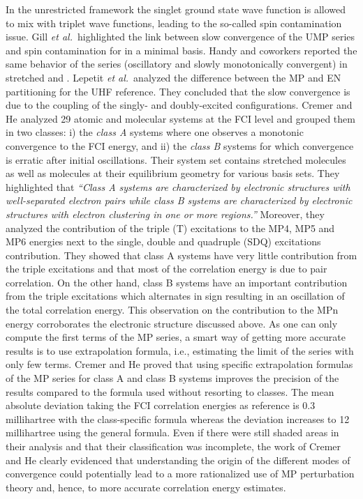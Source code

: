 \documentclass[aps,prb,reprint,noshowkeys,superscriptaddress]{revtex4-1}
\newcommand{\latin}[1]{#1}
\newcommand{\ie}{\latin{i.e.}}
\begin{document}
In the unrestricted framework the singlet ground state wave function is allowed to mix with triplet wave functions, leading to the so-called spin contamination issue. Gill \textit{et al.}~highlighted the link between slow convergence of the UMP series and spin contamination for  in a minimal basis. \cite{Gill_1988}
Handy and coworkers reported the same behavior of the series (oscillatory and slowly monotonically convergent) in stretched  and . \cite{Handy_1985} Lepetit \textit{et al.}~analyzed the difference between the MP and EN partitioning for the UHF reference. \cite{Lepetit_1988} 
They concluded that the slow convergence is due to the coupling of the singly- and doubly-excited configurations. 
Cremer and He analyzed 29 atomic and molecular systems at the FCI level \cite{Cremer_1996} and grouped them in two classes: i) the \textit{class A} systems where one observes a monotonic convergence to the FCI energy, and ii) the \textit{class B} systems for which convergence is erratic after initial oscillations. Their system set contains stretched molecules as well as molecules at their equilibrium geometry for various basis sets. They highlighted that \cite{Cremer_1996}
\textit{``Class A systems are characterized by electronic structures with well-separated electron pairs while class B systems are characterized by electronic structures with electron clustering in one or more regions.''}
Moreover, they analyzed the contribution of the triple (T) excitations to the MP4, MP5 and MP6 energies next to the single, double and quadruple (SDQ) excitations contribution.
They showed that class A systems have very little contribution from the triple excitations and that most of the correlation energy is due to pair correlation. On the other hand, class B systems have an important contribution from the triple excitations which alternates in sign resulting in an oscillation of the total correlation energy.
This observation on the contribution to the MPn energy corroborates the electronic structure discussed above.
As one can only compute the first terms of the MP series, a smart way of getting more accurate results is to use extrapolation formula, \ie, estimating the limit of the series with only few terms. 
Cremer and He proved that using specific extrapolation formulas of the MP series for class A and class B systems improves the precision of the results compared to the formula used without resorting to classes. The mean absolute deviation taking the FCI correlation energies as reference is $0.3$ millihartree with the class-specific formula whereas the deviation increases to 12 millihartree using the general formula.  
Even if there were still shaded areas in their analysis and that their classification was incomplete, the work of Cremer and He clearly evidenced that understanding the origin of the different modes of convergence could potentially lead to a more rationalized use of MP perturbation theory and, hence, to more accurate correlation energy estimates.
\end{document}
